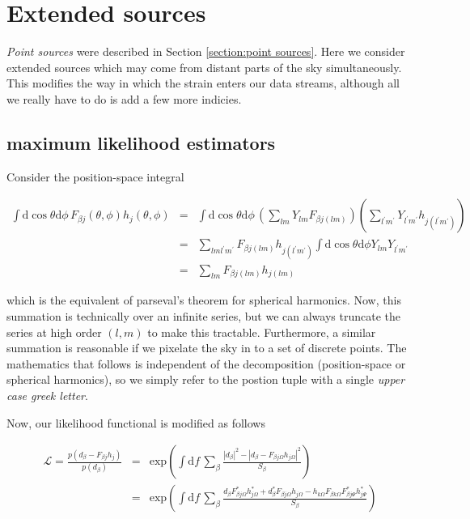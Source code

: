 \documentclass[10pt]{article}
\begin{document}
\section{Extended sources}\label{section:extended sources}

\emph{Point sources} were described in Section \ref{section:point sources}. Here we consider extended sources which may come from distant parts of the sky simultaneously. This modifies the way in which the strain enters our data streams, although all we really have to do is add a few more indicies. 

\subsection{maximum likelihood estimators}

Consider the position-space integral

\begin{eqnarray}
\int \mathrm{d}\cos\theta \mathrm{d}\phi\, F_{\beta j}\left(\theta,\phi\right) h_{j}\left(\theta,\phi\right) & = & \int \mathrm{d}\cos\theta \mathrm{d}\phi\, \left( \sum\limits_{lm} Y_{lm} F_{\beta j (lm)} \right) \left( \sum\limits_{l^\prime m^\prime} Y_{l^\prime m^\prime} h_{j (l^\prime m^\prime)} \right) \\
& = & \sum\limits_{l m l^\prime m^\prime} F_{\beta j (lm)}  h_{j (l^\prime m^\prime)} \int \mathrm{d}\cos\theta \mathrm{d}\phi Y_{lm} Y_{l^\prime m^\prime} \\
& = & \sum\limits_{lm} F_{\beta j (l m)} h_{j (l m)}
\end{eqnarray}

which is the equivalent of parseval's theorem for spherical harmonics. Now, this summation is technically over an infinite series, but we can always truncate the series at high order $(l,m)$ to make this tractable. Furthermore, a similar summation is reasonable if we pixelate the sky in
to a set of discrete points. The mathematics that follows is independent of the decomposition (position-space or spherical harmonics), so we simply refer to the postion tuple with a single \emph{upper case greek letter}.


Now, our likelihood functional is modified as follows

\begin{eqnarray}
\mathcal{L} = \frac{p(d_\beta - F_{\beta j}h_j)}{p(d_\beta)} & = & \mathrm{exp}\left(\int\mathrm{d}f\, \sum_\beta \frac{\left|d_\beta\right|^2 - \left|d_\beta - F_{\beta j \Omega}h_{j \Omega}\right|^2}{S_\beta} \right) \\
                                              & = & \mathrm{exp}\left(\int\mathrm{d}f\, \sum_\beta \frac{d_\beta F_{\beta j \Omega}^\ast h_{j \Omega}^\ast + d_\beta^\ast F_{\beta j \Omega}h_{j \Omega} - h_{k \Omega} F_{\beta k \Omega} F_{\beta j \Psi}^\ast h_{j \Psi}^\ast}{S_\beta} \right)
\end{eqnarray}
\end{document}

